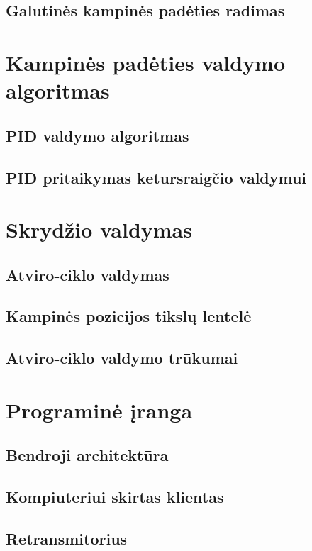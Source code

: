 \documentclass[12pt, a4paper, lithuanian, final]{article}
\begin{document}
\subsection{Galutinės kampinės padėties radimas}



\section{Kampinės padėties valdymo algoritmas}
\subsection{PID valdymo algoritmas}
\subsection{PID pritaikymas ketursraigčio valdymui}



\section{Skrydžio valdymas}
\subsection{Atviro-ciklo valdymas}
\subsection{Kampinės pozicijos tikslų lentelė}
\subsection{Atviro-ciklo valdymo trūkumai}



\section{Programinė įranga}
\subsection{Bendroji architektūra}
\subsection{Kompiuteriui skirtas klientas}
\subsection{Retransmitorius}
\end{document}
